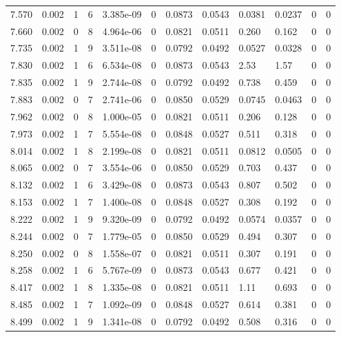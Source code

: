 \documentclass[preview]{standalone}
\begin{document}
{{{{{\begin{tabular}{L{1.2cm}C{1.2cm} C{0.3cm}C{0.5cm} C{1.4cm}C{1.4cm} C{1.4cm}C{1.4cm} C{1.6cm}C{1.6cm} C{1.6cm}C{1.6cm}}
  7.570  &  0.002  & 1     &  6 &  3.385e-09  & 0  &  0.0873&   0.0543& 0.0381 & 0.0237   &  0 & 0  \\ 
  7.660  &  0.002  & 0     &  8 &  4.964e-06  & 0  &  0.0821&   0.0511& 0.260 & 0.162   &  0 & 0  \\ 
  7.735  &  0.002  & 1     &  9 &  3.511e-08  & 0  &  0.0792&   0.0492& 0.0527 & 0.0328   &  0 & 0  \\ 
  7.830  &  0.002  & 1     &  6 &  6.534e-08  & 0  &  0.0873&   0.0543& 2.53 & 1.57   &  0 & 0  \\ 
  7.835  &  0.002  & 1     &  9 &  2.744e-08  & 0  &  0.0792&   0.0492& 0.738 & 0.459   &  0 & 0  \\ 
  7.883  &  0.002  & 0     &  7 &  2.741e-06  & 0  &  0.0850&   0.0529& 0.0745 & 0.0463   &  0 & 0  \\ 
  7.962  &  0.002  & 0     &  8 &  1.000e-05  & 0  &  0.0821&   0.0511& 0.206 & 0.128   &  0 & 0  \\ 
  7.973  &  0.002  & 1     &  7 &  5.554e-08  & 0  &  0.0848&   0.0527& 0.511 & 0.318   &  0 & 0  \\ 
  8.014  &  0.002  & 1     &  8 &  2.199e-08  & 0  &  0.0821&   0.0511& 0.0812 & 0.0505   &  0 & 0  \\ 
  8.065  &  0.002  & 0     &  7 &  3.554e-06  & 0  &  0.0850&   0.0529& 0.703 & 0.437   &  0 & 0  \\ 
  8.132  &  0.002  & 1     &  6 &  3.429e-08  & 0  &  0.0873&   0.0543& 0.807 & 0.502   &  0 & 0  \\ 
  8.153  &  0.002  & 1     &  7 &  1.400e-08  & 0  &  0.0848&   0.0527& 0.308 & 0.192   &  0 & 0  \\ 
  8.222  &  0.002  & 1     &  9 &  9.320e-09  & 0  &  0.0792&   0.0492& 0.0574 & 0.0357   &  0 & 0  \\ 
  8.244  &  0.002  & 0     &  7 &  1.779e-05  & 0  &  0.0850&   0.0529& 0.494 & 0.307   &  0 & 0  \\ 
  8.250  &  0.002  & 0     &  8 &  1.558e-07  & 0  &  0.0821&   0.0511& 0.307 & 0.191   &  0 & 0  \\ 
  8.258  &  0.002  & 1     &  6 &  5.767e-09  & 0  &  0.0873&   0.0543& 0.677 & 0.421   &  0 & 0  \\ 
  8.417  &  0.002  & 1     &  8 &  1.335e-08  & 0  &  0.0821&   0.0511& 1.11 & 0.693   &  0 & 0  \\ 
  8.485  &  0.002  & 1     &  7 &  1.092e-09  & 0  &  0.0848&   0.0527& 0.614 & 0.381   &  0 & 0  \\ 
  8.499  &  0.002  & 1     &  9 &  1.341e-08  & 0  &  0.0792&   0.0492& 0.508 & 0.316   &  0 & 0  \\ 

\end{tabular}}}}}}
\end{document}
